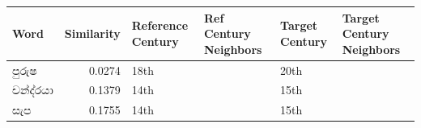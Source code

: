 ﻿\begin{tabular}{lrllll}
\toprule
Word & Similarity & Reference Century & Ref Century Neighbors & Target Century & Target Century Neighbors \\
\midrule
පුරුෂ & 0.0274 & 18th & & 20th & \\
චන්ද්රයා & 0.1379 & 14th & & 15th & \\
සැප & 0.1755 & 14th & & 15th & \\
\bottomrule
\end{tabular}
